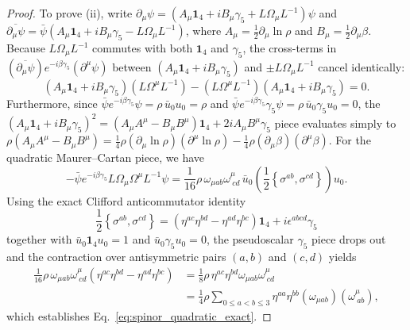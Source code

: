\documentclass[11pt, a4paper]{article}
\theoremstyle{definition}
\begin{document}
\begin{proof}
To prove (ii), write $\partial_\mu \psi = (A_\mu \mathbf{1}_4 + i B_\mu \gamma_5 + L \Omega_\mu L^{-1})\psi$ and $\overline{\partial_\mu \psi} = \bar{\psi}(A_\mu \mathbf{1}_4 + i B_\mu \gamma_5 - L \Omega_\mu L^{-1})$, where $A_\mu = \frac{1}{2}\partial_\mu \ln\rho$ and $B_\mu = \frac{1}{2}\partial_\mu \beta$. Because $L \Omega_\mu L^{-1}$ commutes with both $\mathbf{1}_4$ and $\gamma_5$, the cross-terms in $(\overline{\partial_\mu \psi})e^{-i\beta\gamma_5}(\partial^\mu \psi)$ between $(A_\mu \mathbf{1}_4 + i B_\mu \gamma_5)$ and $\pm L \Omega_\mu L^{-1}$ cancel identically:
\begin{equation}
(A_\mu \mathbf{1}_4 + i B_\mu \gamma_5)(L \Omega^\mu L^{-1}) - (L \Omega^\mu L^{-1})(A_\mu \mathbf{1}_4 + i B_\mu \gamma_5) = 0.
\end{equation}
Furthermore, since $\bar{\psi} e^{-i\beta\gamma_5} \psi = \rho\,\bar{u}_0 u_0 = \rho$ and $\bar{\psi} e^{-i\beta\gamma_5} \gamma_5 \psi = \rho\,\bar{u}_0 \gamma_5 u_0 = 0$, the $(A_\mu \mathbf{1}_4 + i B_\mu \gamma_5)^2 = (A_\mu A^\mu - B_\mu B^\mu)\mathbf{1}_4 + 2i A_\mu B^\mu \gamma_5$ piece evaluates simply to $\rho(A_\mu A^\mu - B_\mu B^\mu) = \frac{1}{4}\rho(\partial_\mu \ln\rho)(\partial^\mu \ln\rho) - \frac{1}{4}\rho(\partial_\mu \beta)(\partial^\mu \beta)$. For the quadratic Maurer--Cartan piece, we have
\begin{equation}
-\bar{\psi} e^{-i\beta\gamma_5} L \Omega_\mu \Omega^\mu L^{-1} \psi = \frac{1}{16}\rho\,\omega_{\mu ab}\omega^\mu_{\ cd} \, \bar{u}_0 \left( \frac{1}{2}\left\{\sigma^{ab}, \sigma^{cd}\right\} \right) u_0.
\end{equation}
Using the exact Clifford anticommutator identity
\begin{equation}
\label{eq:sigma_anticomm}
\frac{1}{2}\left\{\sigma^{ab}, \sigma^{cd}\right\} = \left(\eta^{ac}\eta^{bd} - \eta^{ad}\eta^{bc}\right)\mathbf{1}_4 + i\epsilon^{abcd}\gamma_5
\end{equation}
together with $\bar{u}_0 \mathbf{1}_4 u_0 = 1$ and $\bar{u}_0 \gamma_5 u_0 = 0$, the pseudoscalar $\gamma_5$ piece drops out and the contraction over antisymmetric pairs $(a,b)$ and $(c,d)$ yields
\begin{equation}
\begin{aligned}
\frac{1}{16}\rho\,\omega_{\mu ab}\omega^\mu_{\ cd}\left(\eta^{ac}\eta^{bd} - \eta^{ad}\eta^{bc}\right) &= \frac{1}{8}\rho\,\eta^{ac}\eta^{bd}\omega_{\mu ab}\omega^\mu_{\ cd} \\
&= \frac{1}{4}\rho \sum_{0 \le a < b \le 3} \eta^{aa}\eta^{bb} (\omega_{\mu ab})(\omega^\mu_{\ ab}),
\end{aligned}
\end{equation}
which establishes Eq.~\eqref{eq:spinor_quadratic_exact}.


\end{proof}
\end{document}
